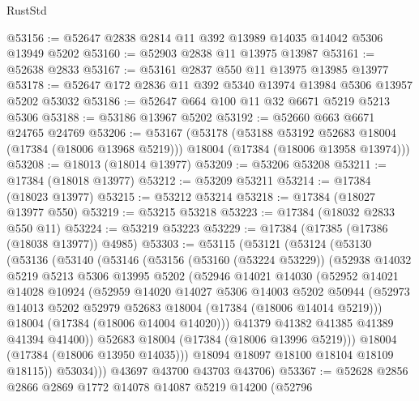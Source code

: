\begin{lexlean}{RustStd}
\begin{coremodule}
@53156 := @52647 @2838 @2814 @11 @392 @13989 @14035 @14042 @5306 @13949 @5202
@53160 := @52903 @2838 @11 @13975 @13987
@53161 := @52638 @2833
@53167 := @53161 @2837 @550 @11 @13975 @13985 @13977
@53178 := @52647 @172 @2836 @11 @392 @5340 @13974 @13984 @5306 @13957 @5202 @53032
@53186 := @52647 @664 @100 @11 @32 @6671 @5219 @5213 @5306
@53188 := @53186 @13967 @5202
@53192 := @52660 @663 @6671 @24765 @24769
@53206 := @53167
    (@53178
      (@53188 @53192 @52683 @18004 (@17384 (@18006 @13968 @5219)))
      @18004
      (@17384 (@18006 @13958 @13974)))
@53208 := @18013 (@18014 @13977)
@53209 := @53206 @53208
@53211 := @17384 (@18018 @13977)
@53212 := @53209 @53211
@53214 := @17384 (@18023 @13977)
@53215 := @53212 @53214
@53218 := @17384 (@18027 @13977 @550)
@53219 := @53215 @53218
@53223 := @17384 (@18032 @2833 @550 @11)
@53224 := @53219 @53223
@53229 := @17384 (@17385 (@17386 (@18038 @13977)) @4985)
@53303 := @53115
    (@53121
      (@53124
        (@53130
          (@53136
            (@53140
              (@53146
                (@53156
                  (@53160 (@53224 @53229))
                  (@52938
                    @14032
                    @5219
                    @5213
                    @5306
                    @13995
                    @5202
                    (@52946
                      @14021
                      @14030
                      (@52952
                        @14021
                        @14028
                        @10924
                        (@52959
                          @14020
                          @14027
                          @5306
                          @14003
                          @5202
                          @50944
                          (@52973 @14013 @5202 @52979 @52683 @18004 (@17384 (@18006 @14014 @5219)))
                          @18004
                          (@17384 (@18006 @14004 @14020)))
                        @41379
                        @41382
                        @41385
                        @41389
                        @41394
                        @41400))
                    @52683
                    @18004
                    (@17384 (@18006 @13996 @5219)))
                  @18004
                  (@17384 (@18006 @13950 @14035)))
                @18094
                @18097
                @18100
                @18104
                @18109
                @18115))
            @53034)))
      @43697
      @43700
      @43703
      @43706)
@53367 := @52628
    @2856
    @2866
    @2869
    @1772
    @14078
    @14087
    @5219
    @14200
    (@52796

\end{coremodule}
\end{lexlean}
